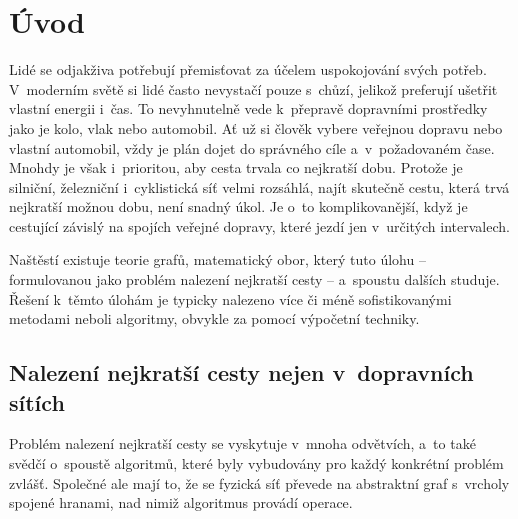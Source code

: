 \renewcommand{\tableautorefname}{tabulce}
\renewcommand{\figureautorefname}{obrázku}
\renewcommand{\subsectionautorefname}{pododdíl}
\renewcommand{\sectionautorefname}{oddíl}
\renewcommand{\chapterautorefname}{kapitole}

\chapter*{Úvod}
Lidé se odjakživa potřebují přemisťovat za účelem uspokojování svých potřeb. V~moderním světě si lidé často nevystačí pouze s~chůzí, jelikož preferují ušetřit vlastní energii i~čas. To nevyhnutelně vede k~přepravě dopravními prostředky jako je kolo, vlak nebo automobil. Ať už si člověk vybere veřejnou dopravu nebo vlastní automobil, vždy je plán dojet do správného cíle a~v~požadovaném čase. Mnohdy je však i~prioritou, aby cesta trvala co nejkratší dobu. Protože je silniční, železniční i~cyklistická síť velmi rozsáhlá, najít skutečně cestu, která trvá nejkratší možnou dobu, není snadný úkol. Je o~to komplikovanější, když je cestující závislý na spojích veřejné dopravy, které jezdí jen v~určitých intervalech.

Naštěstí existuje teorie grafů, matematický obor, který tuto úlohu -- formulovanou jako problém nalezení nejkratší cesty -- a~spoustu dalších studuje. Řešení k~těmto úlohám je typicky nalezeno více či méně sofistikovanými metodami neboli algoritmy, obvykle za pomocí výpočetní techniky.

\section*{Nalezení nejkratší cesty nejen v~dopravních sítích}
Problém nalezení nejkratší cesty se vyskytuje v~mnoha odvětvích, a~to také svědčí o~spoustě algoritmů, které byly vybudovány pro každý konkrétní problém zvlášť. Společné ale mají to, že se fyzická síť převede na abstraktní graf s~vrcholy spojené hranami, nad nimiž algoritmus provádí operace.

